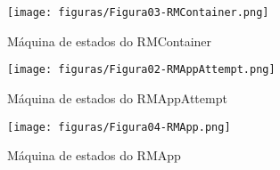 \begin{figure}[hbtn]
   \centering
   \texttt{[image: figuras/Figura03-RMContainer.png]}
   \caption{Máquina de estados do RMContainer}
   \label{fig:RMContainer}
\end{figure}

\begin{figure}[hbtn]
   \centering
   \texttt{[image: figuras/Figura02-RMAppAttempt.png]}
   \caption{Máquina de estados do RMAppAttempt}
   \label{fig:RMAppAttempt}
\end{figure}

\begin{figure}[hbtn]
   \centering
   \texttt{[image: figuras/Figura04-RMApp.png]}
   \caption{Máquina de estados do RMApp}
   \label{fig:RMApp}
\end{figure}